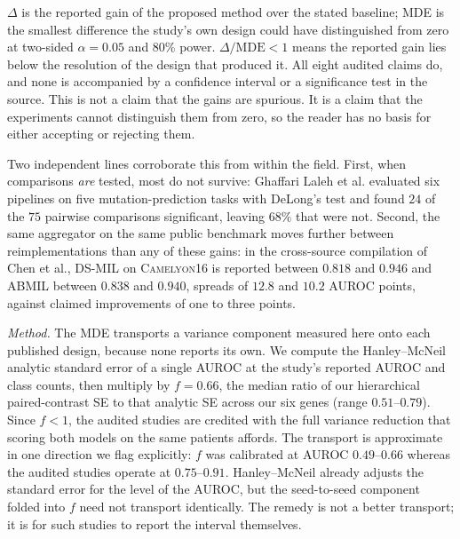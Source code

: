 \begin{flushleft}\footnotesize
$\Delta$ is the reported gain of the proposed method over the stated baseline;
MDE is the smallest difference the study's own design could have distinguished
from zero at two-sided $\alpha\!=\!0.05$ and $80\%$ power.
$\Delta/\text{MDE}\!<\!1$ means the reported gain lies below the resolution of
the design that produced it. All eight audited claims do, and none is
accompanied by a confidence interval or a significance test in the source.
This is not a claim that the gains are spurious. It is a claim that the
experiments cannot distinguish them from zero, so the reader has no basis for
either accepting or rejecting them.
\par\medskip
Two independent lines corroborate this from within the field.
First, when comparisons \emph{are} tested, most do not survive: Ghaffari Laleh
et al.\cite{ghaffarilaleh2022benchmarking} evaluated six pipelines on five
mutation-prediction tasks with DeLong's test and found $24$ of the $75$
pairwise comparisons significant, leaving $68\%$ that were not.
Second, the same aggregator on the same public benchmark moves further between
reimplementations than any of these gains: in the cross-source compilation of
Chen et al.\cite{chen2024benchmarking}, DS-MIL on \textsc{Camelyon}16 is
reported between $0.818$ and $0.946$ and ABMIL between $0.838$ and $0.940$,
spreads of $12.8$ and $10.2$ AUROC points, against claimed improvements of one
to three points.
\par\medskip
\emph{Method.} The MDE transports a variance component measured here onto each
published design, because none reports its own. We compute the Hanley--McNeil
analytic standard error of a single AUROC at the study's reported AUROC and
class counts, then multiply by $f\!=\!0.66$, the median ratio of our
hierarchical paired-contrast SE to that analytic SE across our six genes
(range $0.51$--$0.79$). Since $f\!<\!1$, the audited studies are credited with
the full variance reduction that scoring both models on the same patients
affords. The transport is approximate in one direction we flag explicitly:
$f$ was calibrated at AUROC $0.49$--$0.66$ whereas the audited studies operate
at $0.75$--$0.91$. Hanley--McNeil already adjusts the standard error for the
level of the AUROC, but the seed-to-seed component folded into $f$ need not
transport identically. The remedy is not a better transport; it is for such
studies to report the interval themselves.
\end{flushleft}
